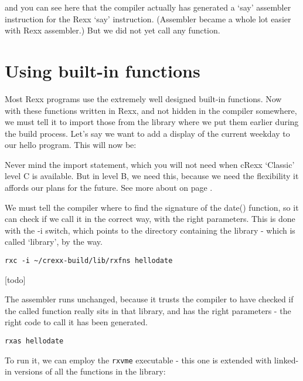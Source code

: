 

and you can see here that the compiler actually has generated a `say'
assembler instruction for the Rexx `say' instruction. (Assembler became
a whole lot easier with Rexx assembler.) But we did not yet call any
function.

\hypertarget{using-built-in-functions}{%
\section{Using built-in functions}\label{using-built-in-functions}}

Most Rexx programs use the extremely well designed built-in functions.
Now with these functions written in Rexx, and not hidden in the compiler
somewhere, we must tell it to import those from the library where we put
them earlier during the build process. Let's say we want to add a
display of the current weekday to our hello program. This will now be:



Never mind the import statement, which you will not need when cRexx
`Classic' level C is available. But in level B, we need this, because we
need the flexibility it affords our plans for the future. See more
about  on page \pageref{intraImport}.

We must tell the compiler where to find the signature of the date()
function, so it can check if we call it in the correct way, with the
right parameters. This is done with the -i switch, which points to the
directory containing the library - which is called `library', by the
way.

\begin{verbatim}
rxc -i ~/crexx-build/lib/rxfns hellodate
\end{verbatim}

[todo]


The assembler runs unchanged, because it trusts the compiler to have
checked if the called function really sits in that library, and has the
right parameters - the right code to call it has been generated.

\begin{verbatim}
rxas hellodate
\end{verbatim}

To run it, we can employ the \texttt{rxvme} executable - this one is
extended with linked-in versions of all the functions in the library:

